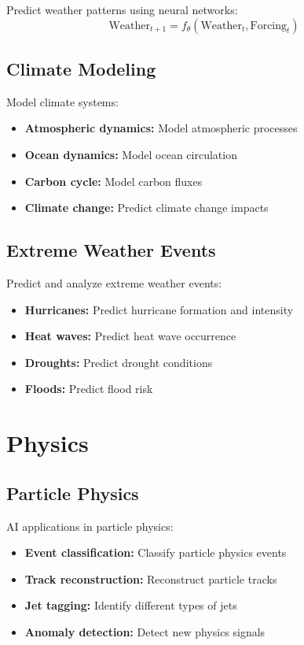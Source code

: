 Predict weather patterns using neural networks:
\begin{equation}
    \text{Weather}_{t+1} = f_\theta(\text{Weather}_t, \text{Forcing}_t)
\end{equation}

\subsection{Climate Modeling}

Model climate systems:
\begin{itemize}
    \item \textbf{Atmospheric dynamics:} Model atmospheric processes
    \item \textbf{Ocean dynamics:} Model ocean circulation
    \item \textbf{Carbon cycle:} Model carbon fluxes
    \item \textbf{Climate change:} Predict climate change impacts
\end{itemize}

\subsection{Extreme Weather Events}

Predict and analyze extreme weather events:
\begin{itemize}
    \item \textbf{Hurricanes:} Predict hurricane formation and intensity
    \item \textbf{Heat waves:} Predict heat wave occurrence
    \item \textbf{Droughts:} Predict drought conditions
    \item \textbf{Floods:} Predict flood risk
\end{itemize}

\section{Physics}

\subsection{Particle Physics}

AI applications in particle physics:
\begin{itemize}
    \item \textbf{Event classification:} Classify particle physics events
    \item \textbf{Track reconstruction:} Reconstruct particle tracks
    \item \textbf{Jet tagging:} Identify different types of jets
    \item \textbf{Anomaly detection:} Detect new physics signals
\end{itemize}

